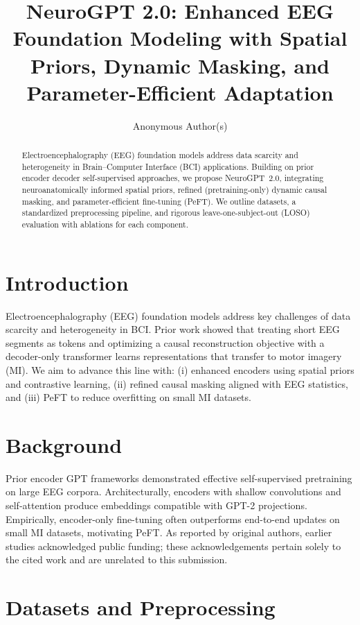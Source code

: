 \documentclass[letterpaper]{article}
\title{NeuroGPT 2.0: Enhanced EEG Foundation Modeling with Spatial Priors, Dynamic Masking, and Parameter-Efficient Adaptation}
\author{Anonymous Author(s)}
\begin{document}
\maketitle

\begin{abstract}
Electroencephalography (EEG) foundation models address data scarcity and heterogeneity in Brain--Computer Interface (BCI) applications. Building on prior encoder\,\textendash\,decoder self-supervised approaches, we propose NeuroGPT~2.0, integrating neuroanatomically informed spatial priors, refined (pretraining-only) dynamic causal masking, and parameter-efficient fine-tuning (PeFT). We outline datasets, a standardized preprocessing pipeline, and rigorous leave-one-subject-out (LOSO) evaluation with ablations for each component.
\end{abstract}

\section{Introduction}
Electroencephalography (EEG) foundation models address key challenges of data scarcity and heterogeneity in BCI. Prior work showed that treating short EEG segments as tokens and optimizing a causal reconstruction objective with a decoder-only transformer learns representations that transfer to motor imagery (MI). We aim to advance this line with: (i) enhanced encoders using spatial priors and contrastive learning, (ii) refined causal masking aligned with EEG statistics, and (iii) PeFT to reduce overfitting on small MI datasets.

\section{Background}
Prior encoder\,\textendash\,GPT frameworks demonstrated effective self-supervised pretraining on large EEG corpora. Architecturally, encoders with shallow convolutions and self-attention produce embeddings compatible with GPT-2 projections. Empirically, encoder-only fine-tuning often outperforms end-to-end updates on small MI datasets, motivating PeFT. As reported by original authors, earlier studies acknowledged public funding; these acknowledgements pertain solely to the cited work and are unrelated to this submission.

\section{Datasets and Preprocessing}
\end{document}
